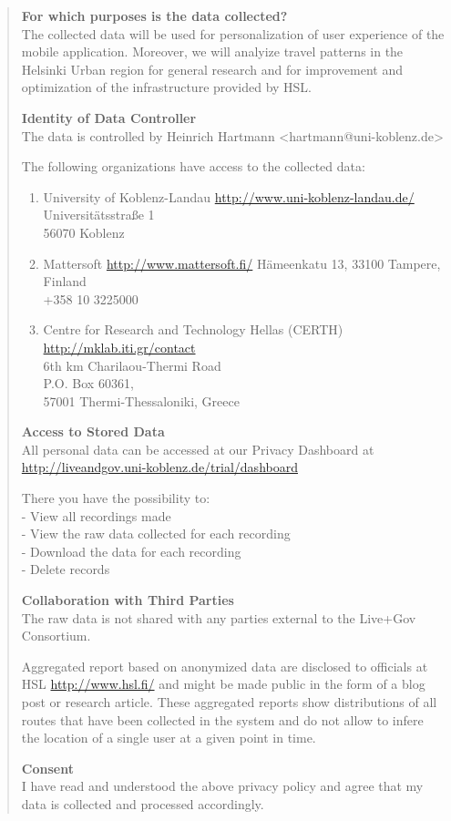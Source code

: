 \begin{quote}
\textbf{For which purposes is the data collected?}\\
The collected data will be used for personalization of user experience of the mobile application.
Moreover, we will analyize travel patterns in the Helsinki Urban region for general research and for improvement and optimization of the
infrastructure provided by HSL.

\textbf{Identity of Data Controller}\\
The data is controlled by Heinrich Hartmann <hartmann@uni-koblenz.de>

The following organizations have access to the collected data:
\begin{enumerate}
\item University of Koblenz-Landau
\url{http://www.uni-koblenz-landau.de/}\\
Universitätsstraße 1\\
56070 Koblenz

\item Mattersoft
\url{http://www.mattersoft.fi/}
Hämeenkatu 13, 33100 Tampere, Finland\\
+358 10 3225000

\item Centre for Research and Technology Hellas (CERTH)
\url{http://mklab.iti.gr/contact}\\
6th km Charilaou-Thermi Road\\
P.O. Box 60361,\\
57001 Thermi-Thessaloniki, Greece
\end{enumerate}

\textbf{Access to Stored Data}\\
All personal data can be accessed at our Privacy Dashboard at
\url{http://liveandgov.uni-koblenz.de/trial/dashboard}

There you have the possibility to:\\
- View all recordings made\\
- View the raw data collected for each recording\\
- Download the data for each recording\\
- Delete records

\textbf{Collaboration with Third Parties}\\
The raw data is not shared with any parties external to the Live+Gov Consortium.

Aggregated report based on anonymized data are disclosed to officials at HSL \url{http://www.hsl.fi/} and might be made
public in the form of a blog post or research article.  These aggregated reports show distributions of all routes that
have been collected in the system and do not allow to infere the location of a single user at a given point in time.

\textbf{Consent}\\
I have read and understood the above privacy policy and agree that my data is collected and processed accordingly.
\end{quote}

